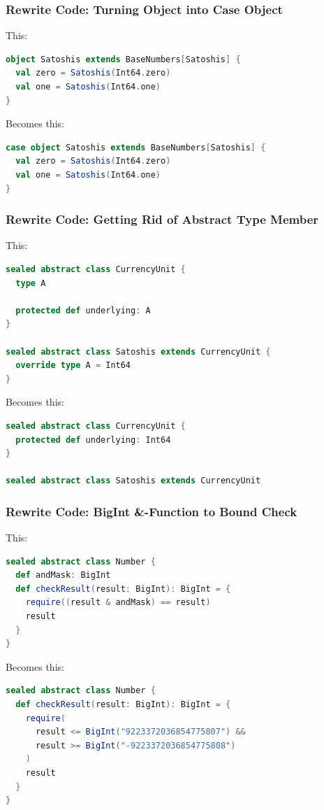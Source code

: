 \documentclass{beamer}
\begin{document}
\begin{frame}[fragile]
\frametitle{Rewrite Code: Turning Object into Case Object}
This:
\begin{lstlisting}[language=Scala]
object Satoshis extends BaseNumbers[Satoshis] {
  val zero = Satoshis(Int64.zero)
  val one = Satoshis(Int64.one)
}
\end{lstlisting}

Becomes this:
\begin{lstlisting}[language=Scala]
case object Satoshis extends BaseNumbers[Satoshis] {
  val zero = Satoshis(Int64.zero)
  val one = Satoshis(Int64.one)
}
\end{lstlisting}
\end{frame}


\begin{frame}[fragile]
\frametitle{Rewrite Code: Getting Rid of Abstract Type Member}
This:
\begin{lstlisting}[language=Scala]
sealed abstract class CurrencyUnit {
  type A

  protected def underlying: A
}

sealed abstract class Satoshis extends CurrencyUnit {
  override type A = Int64
}
\end{lstlisting}

Becomes this:
\begin{lstlisting}[language=Scala]
sealed abstract class CurrencyUnit {
  protected def underlying: Int64
}

sealed abstract class Satoshis extends CurrencyUnit
\end{lstlisting}
\end{frame}


\begin{frame}[fragile]
\frametitle{Rewrite Code: BigInt \&-Function to Bound Check}
This:
\begin{lstlisting}[language=Scala]
sealed abstract class Number {
  def andMask: BigInt
  def checkResult(result: BigInt): BigInt = {
    require((result & andMask) == result)
    result
  }
}  
\end{lstlisting}
Becomes this:
\begin{lstlisting}[language=Scala]
sealed abstract class Number {
  def checkResult(result: BigInt): BigInt = {
    require(
      result <= BigInt("9223372036854775807") &&
      result >= BigInt("-9223372036854775808")
    )
    result
  }
}
\end{lstlisting}
\end{frame}
\end{document}
